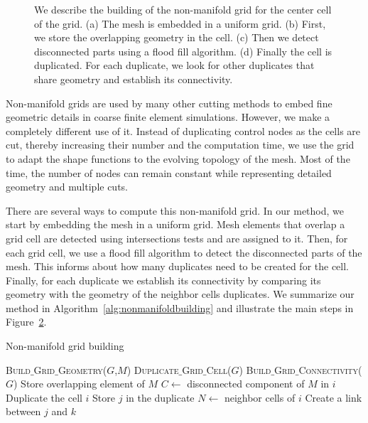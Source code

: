 \begin{figure}[t]
\begin{subfigure}[b]{0.20\linewidth}
\caption{\label{fig:buildNMG4}}
\end{subfigure}
\caption[Frame-based cutting: Non-manifold grid building]{\label{fig:nonmanifoldgridbuilding}
We describe the building of the non-manifold grid for the center cell of the grid. (a) The mesh is embedded in a uniform grid. (b) First, we store the overlapping geometry in the cell. (c) Then we detect disconnected parts using a flood fill algorithm. (d) Finally the cell is duplicated. For each duplicate, we look for other duplicates that share geometry and establish its connectivity.}
\end{figure}

Non-manifold grids are used by many other cutting methods to embed fine geometric details in coarse finite element simulations. However, we make a completely different use of it. Instead of duplicating control nodes as the cells are cut, thereby increasing their number and the computation time, we use the grid to adapt the shape functions to the evolving topology of the mesh. Most of the time, the number of nodes can remain constant while representing detailed geometry and multiple cuts.

There are several ways to compute this non-manifold grid. In our method, we start by embedding the mesh in a uniform grid. Mesh elements that overlap a grid cell are detected using intersections tests and are assigned to it. Then, for each grid cell, we use a flood fill algorithm to detect the disconnected parts of the mesh. This informs about how many duplicates need to be created for the cell. Finally, for each duplicate we establish its connectivity by comparing its geometry with the geometry of the neighbor cells duplicates. We summarize our method in Algorithm~\ref{alg:nonmanifoldbuilding} and illustrate the main steps in Figure~\ref{fig:nonmanifoldgridbuilding}.

\begin{algorithm}[!hb]
\caption[Frame-based cutting: Non-manifold grid building]{\label{alg:nonmanifoldbuilding}Non-manifold grid building}
\begin{algorithmic}[1]
\State \textsc{Build$\_$Grid$\_$Geometry}($G$,$M$)
\State \textsc{Duplicate$\_$Grid$\_$Cell}($G$)
\State \textsc{Build$\_$Grid$\_$Connectivity}($G$)
\EndProcedure
\State
{}
\State Store overlapping element of $M$
\EndFor
\EndProcedure
\State
{}
\State $C \gets $ disconnected component of $M$ in $i$
	\State Duplicate the cell $i$
	\State Store $j$ in the duplicate
\EndFor
\EndFor
\EndProcedure
\State
{}
\State $N \gets $ neighbor cells of $i$
\State Create a link between $j$ and $k$ 
\EndIf
\EndFor
\EndFor
\EndFor
\EndProcedure
\end{algorithmic}
\end{algorithm}

